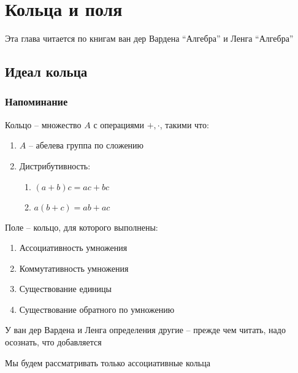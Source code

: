 \chapter{Кольца и поля}

Эта глава читается по книгам ван дер Вардена ``Алгебра'' и Ленга ``Алгебра''

\section{Идеал кольца}

\subsection{Напоминание}

\begin{definition}
	Кольцо -- множество $ A $ с операциями $ +, \cdot $, такими что:
	\begin{enumerate}
		\item $ A $ -- абелева группа по сложению
		\item Дистрибутивность:
		\begin{enumerate}
			\item $ (a + b)c = ac + bc $
			\item $ a(b + c) = ab + ac $
		\end{enumerate}
	\end{enumerate}
\end{definition}

\begin{definition}
	Поле -- кольцо, для которого выполнены:
	\begin{enumerate}
		\item Ассоциативность умножения
		\item Коммутативность умножения
		\item Существование единицы
		\item Существование обратного по умножению
	\end{enumerate}
\end{definition}

\begin{note}
	У ван дер Вардена и Ленга определения другие -- прежде чем читать, надо осознать, что добавляется
\end{note}

\begin{definition}
	Мы будем рассматривать только ассоциативные кольца
\end{definition}

